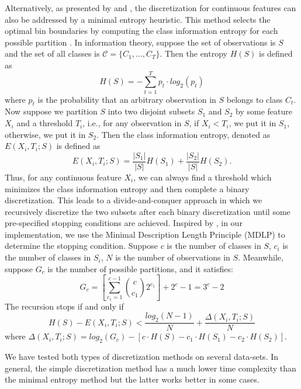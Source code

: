 \documentclass[twoside,11pt]{article}
\begin{document}
Alternatively, as presented by \citet{catlett1991changing} and \citet{fayyad1993multi}, the discretization for continuous features can also be addressed by a minimal entropy heuristic. This method selects the optimal bin boundaries by computing the class information entropy for each possible partition \citep{dougherty1995supervised}. In information theory, suppose the set of observations is $S$ and the set of all classes is $\mathcal{C}=\{C_1,\dots,C_T\}$. Then the entropy $H(S)$ is defined as 
\begin{equation*}
    H(S)=-\sum_{t=1}^T p_t\cdot log_2(p_t)
\end{equation*}
where $p_t$ is the probability that an arbitrary observation in $S$ belongs to class $C_t$. Now suppose we partition $S$ into two disjoint subsets $S_1$ and $S_2$ by some feature $X_i$ and a threshold $T_i$, i.e., for any observation in $S$, if $X_i<T_i$, we put it in $S_1$, otherwise, we put it in $S_2$. Then the class information entropy, denoted as $E(X_i,T_i;S)$ is defined as
\begin{equation*}
    E(X_i,T_i;S)=\frac{|S_1|}{|S|}H(S_1)+\frac{|S_2|}{|S|}H(S_2).
\end{equation*}
Thus, for any continuous feature $X_i$, we can always find a threshold which minimizes the class information entropy and then complete a binary discretization. This leads to a divide-and-conquer approach in which we recursively discretize the two subsets after each binary discretization until some pre-specified stopping conditions are achieved. Inspired by \citet{fayyad1993multi}, in our implementation, we use the Minimal Description Length Principle (MDLP) to determine the stopping condition. Suppose $c$ is the number of classes in $S$, $c_i$ is the number of classes in $S_i$, $N$ is the number of observations in $S$. Meanwhile, suppose $G_c$ is the number of possible partitions, and it satisfies:
\begin{equation*}
G_c=\left[\sum_{c_1=1}^{c-1}\binom{c}{c_1}2^{c_1}\right]+2^c-1=3^c-2
\end{equation*}
The recursion stops if and only if
\begin{equation*}
H(S)-E(X_i,T_i;S)<\frac{log_2(N-1)}{N}+\frac{\Delta(X_i,T_i;S)}{N}
\end{equation*}
where $\Delta(X_i,T_i;S)=log_2(G_c)-[c\cdot H(S)-c_1\cdot H(S_1)-c_2\cdot H(S_2)]$.

We have tested both types of discretization methods on several data-sets. In general, the simple discretization method has a much lower time complexity than the minimal entropy method but the latter works better in some cases.
\end{document}
